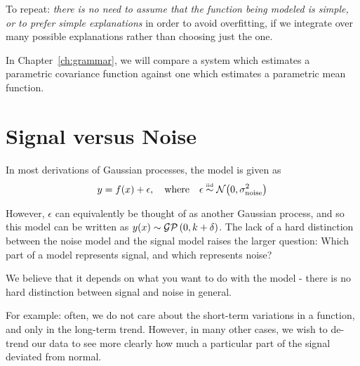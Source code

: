 To repeat: \emph{there is no need to assume that the function being modeled is simple, or to prefer simple explanations} in order to avoid overfitting, if we integrate over many possible explanations rather than choosing just the one.

In Chapter~\ref{ch:grammar}, we will compare a system which estimates a parametric covariance function against one which estimates a parametric mean function.






\section{Signal versus Noise}

In most derivations of Gaussian processes, the model is given as
%
\begin{align}
y = f(x) + \epsilon, \quad \textnormal{where} \quad \epsilon \overset{\mbox{\tiny iid}}{\sim} \mathcal{N}\!\left(0,\sigma^2_{\textnormal{noise}}\right)
\end{align}

However, $\epsilon$ can equivalently be thought of as another Gaussian process, and so this model can be written as $y(x) \sim \mathcal{GP}\left(0, k + \delta \right)$.  The lack of a hard distinction between the noise model and the signal model raises the larger question:  Which part of a model represents signal, and which represents noise?

We believe that it depends on what you want to do with the model - there is no hard distinction between signal and noise in general.

For example: often, we do not care about the short-term variations in a function, and only in the long-term trend.
However, in many other cases, we wish to de-trend our data to see more clearly how much a particular part of the signal deviated from normal.

\fi
